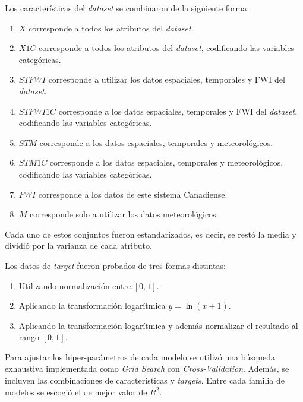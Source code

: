 \documentclass[spanish]{article}
\begin{document}
            Los características del \emph{dataset} se combinaron de la siguiente forma:
            \begin{enumerate}
                \item $X$ corresponde a todos los atributos del \emph{dataset}.
                \item $X1C$ corresponde a todos los atributos del \emph{dataset}, codificando las variables categóricas.
                \item $STFWI$ corresponde a utilizar los datos espaciales, temporales y FWI del \emph{dataset}.
                \item $STFWI1C$ corresponde a los datos espaciales, temporales y FWI del \emph{dataset}, codificando las variables categóricas.
                \item $STM$ corresponde a los datos espaciales, temporales y meteorológicos.
                \item $STM1C$ corresponde a los datos espaciales, temporales y meteorológicos, codificando las variables categóricas.
                \item $FWI$ corresponde a los datos de este sistema Canadiense.
                \item $M$ corresponde solo a utilizar los datos meteorológicos.
            \end{enumerate}
            
            Cada uno de estos conjuntos fueron estandarizados, es decir, se restó la media y dividió por la varianza de cada atributo.
            
            Los datos de \emph{target} fueron probados de tres formas distintas:
            \begin{enumerate}
                \item Utilizando normalización entre $[0, 1]$.
                \item Aplicando la transformación logarítmica $y=\ln(x+1)$.
                \item Aplicando la transformación logarítmica y además normalizar el resultado al rango $[0, 1]$.
            \end{enumerate}
            
            Para ajustar los hiper-parámetros de cada modelo se utilizó una búsqueda exhaustiva implementada como \emph{Grid Search} con \emph{Cross-Validation}.
            Además, se incluyen las combinaciones de características y \emph{targets}. Entre cada familia de modelos se escogió el de mejor valor de $R^2$.
            
\end{document}
